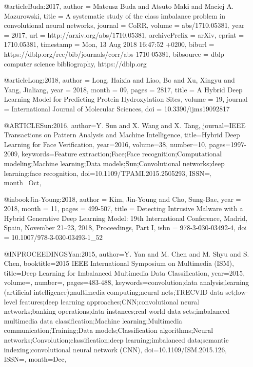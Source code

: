 @article{Buda:2017,
  author    = {Mateusz Buda and
               Atsuto Maki and
               Maciej A. Mazurowski},
  title     = {A systematic study of the class imbalance problem in convolutional
               neural networks},
  journal   = {CoRR},
  volume    = {abs/1710.05381},
  year      = {2017},
  url       = {http://arxiv.org/abs/1710.05381},
  archivePrefix = {arXiv},
  eprint    = {1710.05381},
  timestamp = {Mon, 13 Aug 2018 16:47:52 +0200},
  biburl    = {https://dblp.org/rec/bib/journals/corr/abs-1710-05381},
  bibsource = {dblp computer science bibliography, https://dblp.org}
}

@article{Long:2018,
author = {Long, Haixia and Liao, Bo and Xu, Xingyu and Yang, Jialiang},
year = {2018},
month = {09},
pages = {2817},
title = {A Hybrid Deep Learning Model for Predicting Protein Hydroxylation Sites},
volume = {19},
journal = {International Journal of Molecular Sciences},
doi = {10.3390/ijms19092817}
}

@ARTICLE{Sun:2016,
author={Y. {Sun} and X. {Wang} and X. {Tang}},
journal={IEEE Transactions on Pattern Analysis and Machine Intelligence},
title={Hybrid Deep Learning for Face Verification},
year={2016},
volume={38},
number={10},
pages={1997-2009},
keywords={Feature extraction;Face;Face recognition;Computational modeling;Machine learning;Data models;Sun;Convolutional networks;deep learning;face recognition},
doi={10.1109/TPAMI.2015.2505293},
ISSN={},
month={Oct},}

@inbook{Jin-Young:2018,
author = {Kim, Jin-Young and Cho, Sung-Bae},
year = {2018},
month = {11},
pages = {499-507},
title = {Detecting Intrusive Malware with a Hybrid Generative Deep Learning Model: 19th International Conference, Madrid, Spain, November 21–23, 2018, Proceedings, Part I},
isbn = {978-3-030-03492-4},
doi = {10.1007/978-3-030-03493-1_52}
}

@INPROCEEDINGS{Yan:2015,
author={Y. {Yan} and M. {Chen} and M. {Shyu} and S. {Chen}},
booktitle={2015 IEEE International Symposium on Multimedia (ISM)},
title={Deep Learning for Imbalanced Multimedia Data Classification},
year={2015},
volume={},
number={},
pages={483-488},
keywords={convolution;data analysis;learning (artificial intelligence);multimedia computing;neural nets;TRECVID data set;low-level features;deep learning approaches;CNN;convolutional neural networks;banking operations;data instances;real-world data sets;imbalanced multimedia data classification;Machine learning;Multimedia communication;Training;Data models;Classification algorithms;Neural networks;Convolution;classification;deep learning;imbalanced data;semantic indexing;convolutional neural network (CNN)},
doi={10.1109/ISM.2015.126},
ISSN={},
month={Dec},}

